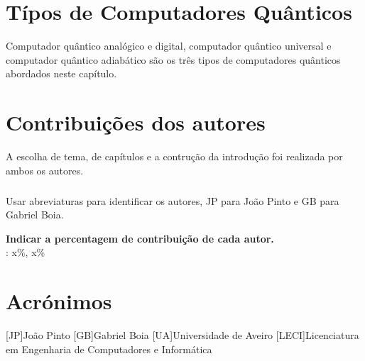 \documentclass{report}
\begin{document}
\chapter{Típos de Computadores Quânticos}
\label{chap.tipos}
Computador quântico analógico e digital, computador quântico universal e computador quântico adiabático são os três tipos de computadores quânticos abordados neste capítulo.

\chapter*{Contribuições dos autores}
A escolha de tema, de capítulos e a contrução da introdução foi realizada por ambos os autores.
\paragraph{} Usar abreviaturas para identificar os autores,
JP para João Pinto e GB para Gabriel Boia.

\vspace{10pt}
\textbf{Indicar a percentagem de contribuição de cada autor.}\\

\autores : x\%, x\%\\

\chapter*{Acrónimos}
\begin{acronym}
[JP]{João Pinto}
[GB]{Gabriel Boia}
[UA]{Universidade de Aveiro}
[LECI]{Licenciatura em Engenharia de Computadores e Informática}
\end{acronym}


\printbibliography
\end{document}
